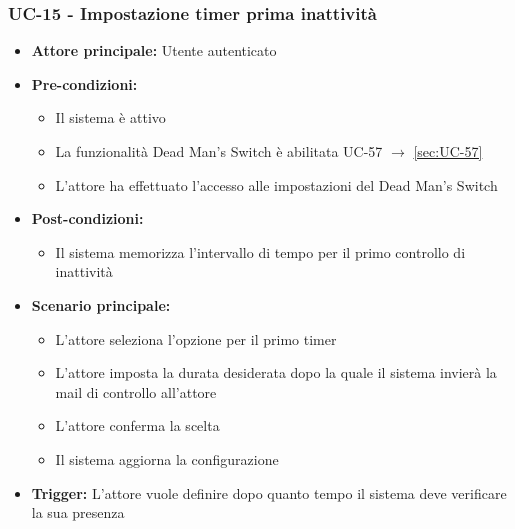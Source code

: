 \documentclass[a4paper,12pt]{article}
\begin{document}
\subsubsection{UC-15 - Impostazione timer prima inattività} \label{sec:UC-15}
\begin{itemize}
    \item \textbf{Attore principale:} Utente autenticato
    \item \textbf{Pre-condizioni:}
    \begin{itemize}
        \item Il sistema è attivo
        \item La funzionalità Dead Man's Switch è abilitata UC-57 $\rightarrow$ \ref{sec:UC-57}
        \item L'attore ha effettuato l'accesso alle impostazioni del Dead Man's Switch
    \end{itemize}
    \item \textbf{Post-condizioni:}
    \begin{itemize}
        \item Il sistema memorizza l'intervallo di tempo per il primo controllo di inattività
    \end{itemize}
    \item \textbf{Scenario principale:} 
    \begin{itemize}
        \item L'attore seleziona l'opzione per il primo timer
        \item L'attore imposta la durata desiderata dopo la quale il sistema invierà la mail di controllo all'attore
        \item L'attore conferma la scelta
        \item Il sistema aggiorna la configurazione
    \end{itemize}
    \item \textbf{Trigger:} L'attore vuole definire dopo quanto tempo il sistema deve verificare la sua presenza
\end{itemize}
\end{document}
